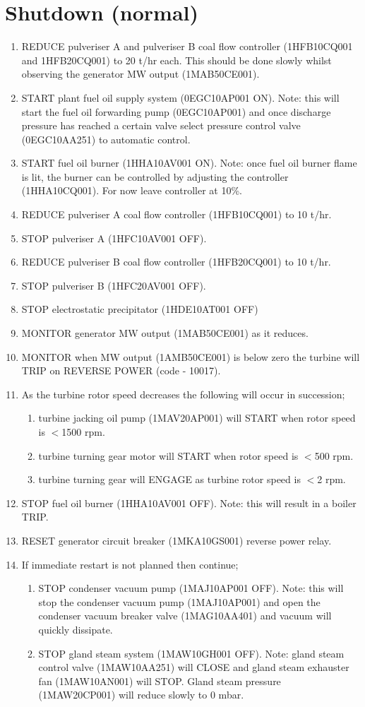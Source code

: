 \documentclass[10pt,a4paper]{article}
\begin{document}
\section*{Shutdown (normal)}
\begin{enumerate}
\item REDUCE pulveriser A and pulveriser B coal flow controller (1HFB10CQ001 and 1HFB20CQ001) to 20 t/hr each. This should be done slowly whilst observing the generator MW output (1MAB50CE001).
\item START plant fuel oil supply system (0EGC10AP001 ON). Note: this will start the fuel oil forwarding pump (0EGC10AP001) and once discharge pressure has reached a certain valve select pressure control valve (0EGC10AA251) to automatic control.
\item START fuel oil burner (1HHA10AV001 ON). Note: once fuel oil burner flame is lit, the burner can be controlled by adjusting the controller (1HHA10CQ001). For now leave controller at 10\%.
\item REDUCE pulveriser A coal flow controller (1HFB10CQ001) to 10 t/hr.
\item STOP pulveriser A (1HFC10AV001 OFF).
\item REDUCE pulveriser B coal flow controller (1HFB20CQ001) to 10 t/hr.
\item STOP pulveriser B (1HFC20AV001 OFF).
\item STOP electrostatic precipitator (1HDE10AT001 OFF)
\item MONITOR generator MW output (1MAB50CE001) as it reduces. 
\item MONITOR when MW output (1AMB50CE001) is below zero the turbine will TRIP on REVERSE POWER (code - 10017).
\item As the turbine rotor speed decreases the following will occur in succession;
\begin{enumerate}
\item turbine jacking oil pump (1MAV20AP001) will START when rotor speed is $<$1500 rpm.
\item turbine turning gear motor will START when rotor speed is $<$500 rpm.
\item turbine turning gear will ENGAGE as turbine rotor speed is $<$2 rpm.
\end{enumerate}
\item STOP fuel oil burner (1HHA10AV001 OFF). Note: this will result in a boiler TRIP.

\item RESET generator circuit breaker (1MKA10GS001) reverse power relay.
\item If immediate restart is not planned then continue;
\begin{enumerate}
\item STOP condenser vacuum pump (1MAJ10AP001 OFF). Note: this will stop the condenser vacuum pump (1MAJ10AP001) and open the condenser vacuum breaker valve (1MAG10AA401) and vacuum will quickly dissipate.
\item STOP gland steam system (1MAW10GH001 OFF). Note: gland steam control valve (1MAW10AA251) will CLOSE and gland steam exhauster fan (1MAW10AN001) will STOP. Gland steam pressure (1MAW20CP001) will reduce slowly to 0 mbar.


\end{enumerate}
\end{enumerate}
\end{document}
